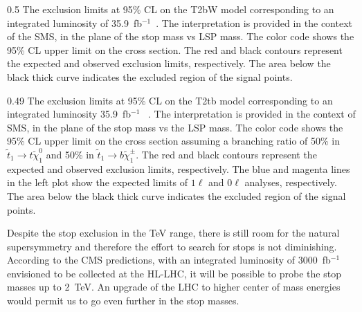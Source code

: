                  {0.5}       %
                 { The exclusion limits at 95\% CL on the T2bW model corresponding to an integrated luminosity of 35.9~fb$^{-1}$~\cite{Sirunyan:2017xse}. The interpretation is provided in the context of the SMS, in the plane of the stop mass vs LSP mass. The color code shows the 95\% CL upper limit on the cross section. The red and black contours represent the expected and observed exclusion limits, respectively. The area below the black thick curve indicates the excluded region of the signal points.  }


                 {0.49}       %
                 { The exclusion limits at 95\% CL on the T2tb model corresponding to an integrated luminosity 35.9~fb$^{-1}$ ~\cite{Sirunyan:2017xse}. The interpretation is provided in the context of SMS, in the plane of the stop mass vs the LSP mass. The color code shows the 95\% CL upper limit on the cross section assuming a branching ratio of 50\% in $ \tilde{t}_{1} \to t  \tilde{\chi}^{0}_{1} $ and 50\% in $ \tilde{t}_{1} \to b  \tilde{\chi}^{\pm}_{1} $. The red and black contours represent the expected and observed exclusion limits, respectively. The blue and magenta lines in the left plot show the expected limits of $1 \ell$ and $0 \ell$ analyses, respectively.  The area below the black thick curve indicates the excluded region of the signal points.  }



Despite the stop exclusion in the TeV range, there is still room for the natural supersymmetry and therefore the effort to search for stops is not diminishing. According to the CMS predictions, with an integrated luminosity of 3000~fb$^{-1}$ envisioned to be collected at the HL-LHC, it will be possible to probe the stop masses up to 2~TeV. An upgrade of the LHC to higher center of mass energies would permit us to go even further in the stop masses. 

